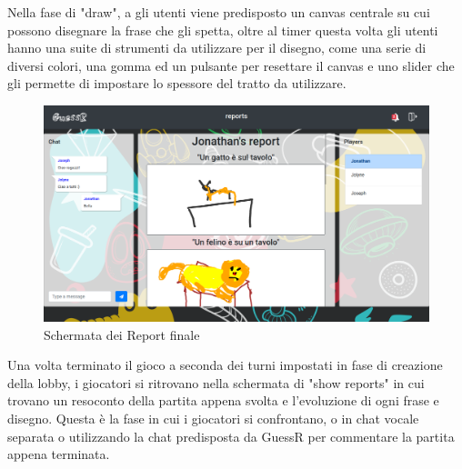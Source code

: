 \noindent Nella fase di "draw", a gli utenti viene predisposto un canvas centrale su cui possono disegnare la frase che gli spetta, oltre al timer questa volta gli utenti hanno una suite di strumenti da utilizzare per il disegno, come una serie di diversi colori, una gomma ed un pulsante per resettare il canvas e uno slider che gli permette di impostare lo spessore del tratto da utilizzare.



\begin{figure}[H]
    \centering
    \includegraphics[width=0.8\linewidth]{img/screen/end_report_1.png}
    \caption{Schermata dei Report finale} 
\end{figure}

\noindent Una volta terminato il gioco a seconda dei turni impostati in fase di creazione della lobby, i giocatori si ritrovano nella schermata di "show reports" in cui trovano un resoconto della partita appena svolta e l'evoluzione di ogni frase e disegno. Questa è la fase in cui i giocatori si confrontano, o in chat vocale separata o utilizzando la chat predisposta da GuessR per commentare la partita appena terminata.

